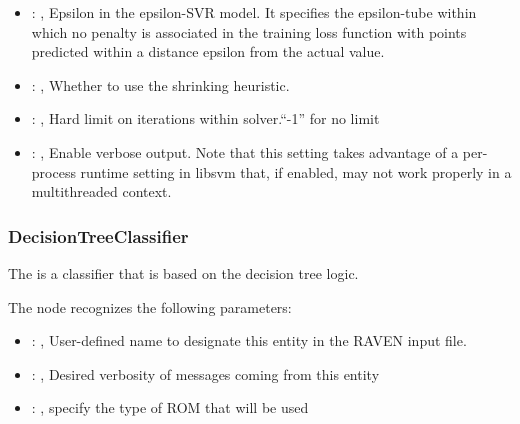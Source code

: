 \begin{itemize}
    \item {}: , 
      Epsilon in the epsilon-SVR model. It specifies the epsilon-tube
      within which no penalty is associated in the training loss function
      with points predicted within a distance epsilon from the actual
      value.

    \item {}: , 
      Whether to use the shrinking heuristic.

    \item {}: , 
      Hard limit on iterations within solver.``-1'' for no limit

    \item {}: , 
      Enable verbose output. Note that this setting takes advantage
      of a per-process runtime setting in libsvm that, if enabled, may not
      work properly in a multithreaded context.
  \end{itemize}


\subsubsection{DecisionTreeClassifier}
  The  is a classifier that is based on the
  decision tree logic.                          

  The  node recognizes the following parameters:
    \begin{itemize}
      \item {}: , 
        User-defined name to designate this entity in the RAVEN input file.
      \item {}: , 
        Desired verbosity of messages coming from this entity
      \item {}: , 
        specify the type of ROM that will be used
  \end{itemize}

